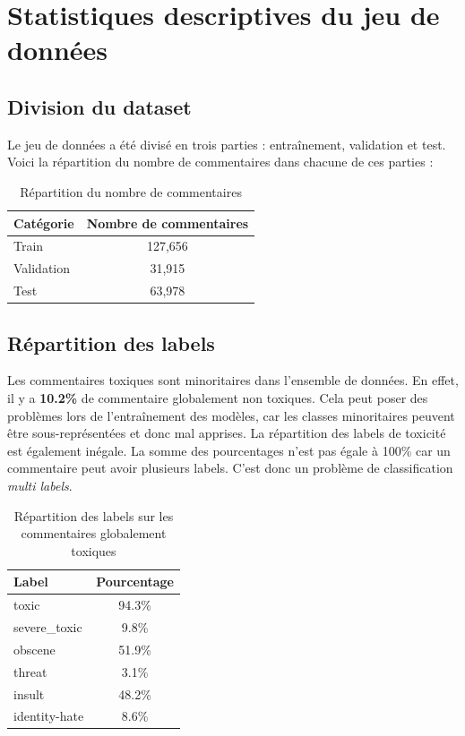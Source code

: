 \chapter{Statistiques descriptives du jeu de données}
\section*{Division du dataset}
Le jeu de données a été divisé en trois parties : entraînement, validation et test. Voici la répartition du nombre de commentaires dans chacune de ces parties :
\begin{table}[h]
\centering
\begin{tabular}{lc}
\toprule
\textbf{Catégorie} & \textbf{Nombre de commentaires} \\
\midrule
Train & 127,656 \\
Validation & 31,915 \\
Test & 63,978 \\
\bottomrule
\end{tabular}
\caption{Répartition du nombre de commentaires}
\end{table}


\section*{Répartition des labels}
Les commentaires toxiques sont minoritaires dans l'ensemble de données. 
En effet, il y a \textbf{10.2\%} de commentaire globalement non toxiques. 
Cela peut poser des problèmes lors de l'entraînement des modèles, car les classes minoritaires peuvent être sous-représentées et donc mal apprises.
La répartition des labels de toxicité est également inégale.
La somme des pourcentages n'est pas égale à 100\% car un commentaire peut avoir plusieurs labels. 
C'est donc un problème de classification \textit{multi labels}.
\begin{table}[h]
\centering
\begin{tabular}{lc}
\toprule
\textbf{Label} & \textbf{Pourcentage} \\
\midrule
toxic & 94.3\% \\
severe\_toxic & 9.8\% \\
obscene & 51.9\% \\
threat & 3.1\% \\
insult & 48.2\% \\
identity-hate & 8.6\% \\ %
\bottomrule
\end{tabular}
\caption{Répartition des labels sur les commentaires globalement toxiques}
\end{table}


